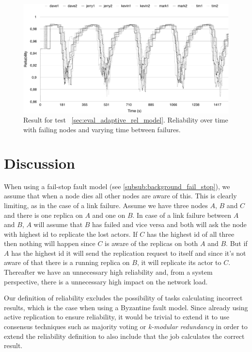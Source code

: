 \documentclass{cslthse-msc}
\begin{document}
\begin{figure}[!hbt]
\centering
\includegraphics[scale=0.5]{images/results/self_adaptive_node_rels.pdf}
\caption{Result for test ~\ref{sec:eval_adaptive_rel_model}. Reliability over time with failing nodes and varying time between failures.} \label{fig:eval_self_adaptive_node_rels}
\end{figure}


\chapter{Discussion} \label{ch:discussion}

When using a fail-stop fault model (see \cref{subsub:background_fail_stop}), we assume that when a node dies all other nodes are aware of this. This is clearly limiting, as in the case of a link failure. Assume we have three nodes $A$, $B$ and $C$ and there is one replica on $A$ and one on $B$. In case of a link failure between $A$ and $B$, $A$ will assume that $B$ has failed and vice versa and both will ask the node with highest id to replicate the lost actors. If $C$ has the highest id of all three then nothing will happen since $C$ is aware of the replicas on both $A$ and $B$. But if $A$ has the highest id it will send the replication request to itself and since it's not aware of that there is a running replica on $B$, it will replicate its actor to $C$. Thereafter we have an unnecessary high reliability and, from a system perspective, there is a unnecessary high impact on the network load.

Our definition of reliability excludes the possibility of tasks calculating incorrect results, which is the case when using a Byzantine fault model. Since already using active replication to ensure reliability, it would be trivial to extend it to use consensus techniques such as majority voting or \emph{k-modular redundancy} in order to extend the reliability definition to also include that the job calculates the correct result.
\end{document}
